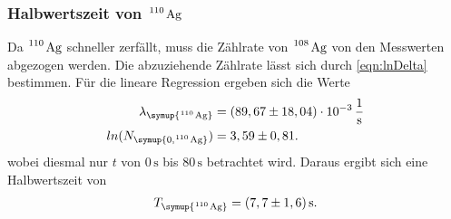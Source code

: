 \subsubsection{Halbwertszeit von $\ce{^110 Ag}$}
\label{sec:110Ag}
Da $\ce{^110 Ag}$ schneller zerfällt, muss die Zählrate von $\ce{^108 Ag}$ von den Messwerten abgezogen werden.
Die abzuziehende Zählrate lässt sich durch \autoref{eqn:lnDelta} bestimmen. Für die lineare Regression ergeben
sich die Werte
\begin{align*}
  \lambda_{\symup{\ce{^110 Ag}}}  &= (89,67 \pm 18,04)\cdot 10^{-3}\,\frac{1}{\unit{\second}} \\
  ln(N_{\symup{0, \ce{^110 Ag}}}) &= 3,59 \pm 0,81. \\
\end{align*}
wobei diesmal nur $t$ von $0\,\unit{\second}$ bis $80\,\unit{\second}$ betrachtet wird. Daraus ergibt sich eine
Halbwertszeit von
\begin{align*}
  T_{\symup{\ce{^110 Ag}}} = (7,7 \pm 1,6)\,\unit{\second}.
\end{align*}